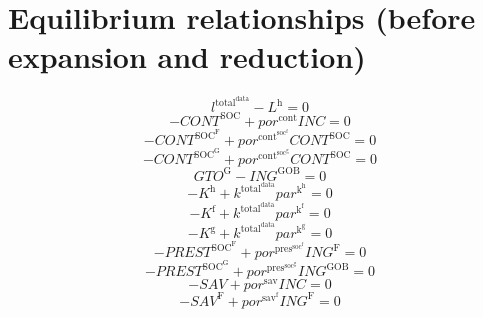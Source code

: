 \section{Equilibrium relationships (before expansion and reduction)}

\begin{equation}
l^{\mathrm{total}^{\mathrm{data}}} - L^{\mathrm{h}} = 0
\end{equation}
\begin{equation}
-{C\!O\!N\!T}^{\mathrm{SOC}} + {{p\!o\!r}^{\mathrm{cont}}} {{I\!N\!C}} = 0
\end{equation}
\begin{equation}
-{C\!O\!N\!T}^{\mathrm{SOC}^{\mathrm{F}}} + {{p\!o\!r}^{\mathrm{cont}^{\mathrm{soc}^{\mathrm{f}}}}} {{C\!O\!N\!T}^{\mathrm{SOC}}} = 0
\end{equation}
\begin{equation}
-{C\!O\!N\!T}^{\mathrm{SOC}^{\mathrm{G}}} + {{p\!o\!r}^{\mathrm{cont}^{\mathrm{soc}^{\mathrm{g}}}}} {{C\!O\!N\!T}^{\mathrm{SOC}}} = 0
\end{equation}
\begin{equation}
{G\!T\!O}^{\mathrm{G}} - {I\!N\!G}^{\mathrm{GOB}} = 0
\end{equation}
\begin{equation}
-K^{\mathrm{h}} + {k^{\mathrm{total}^{\mathrm{data}}}} {{p\!a\!r}^{\mathrm{k}^{\mathrm{h}}}} = 0
\end{equation}
\begin{equation}
-K^{\mathrm{f}} + {k^{\mathrm{total}^{\mathrm{data}}}} {{p\!a\!r}^{\mathrm{k}^{\mathrm{f}}}} = 0
\end{equation}
\begin{equation}
-K^{\mathrm{g}} + {k^{\mathrm{total}^{\mathrm{data}}}} {{p\!a\!r}^{\mathrm{k}^{\mathrm{g}}}} = 0
\end{equation}
\begin{equation}
-{P\!R\!E\!S\!T}^{\mathrm{SOC}^{\mathrm{F}}} + {{p\!o\!r}^{\mathrm{pres}^{\mathrm{soc}^{\mathrm{f}}}}} {{I\!N\!G}^{\mathrm{F}}} = 0
\end{equation}
\begin{equation}
-{P\!R\!E\!S\!T}^{\mathrm{SOC}^{\mathrm{G}}} + {{p\!o\!r}^{\mathrm{pres}^{\mathrm{soc}^{\mathrm{g}}}}} {{I\!N\!G}^{\mathrm{GOB}}} = 0
\end{equation}
\begin{equation}
-{S\!A\!V} + {{p\!o\!r}^{\mathrm{sav}}} {{I\!N\!C}} = 0
\end{equation}
\begin{equation}
-{S\!A\!V}^{\mathrm{F}} + {{p\!o\!r}^{\mathrm{sav}^{\mathrm{f}}}} {{I\!N\!G}^{\mathrm{F}}} = 0
\end{equation}
